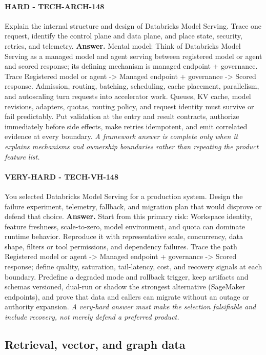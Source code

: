 \paragraph{HARD - TECH-ARCH-148} Explain the internal structure and design of Databricks Model Serving. Trace one request, identify the control plane and data plane, and place state, security, retries, and telemetry.
\textbf{Answer.} Mental model: Think of Databricks Model Serving as a managed model and agent serving between registered model or agent and scored response; its defining mechanism is managed endpoint + governance. Trace Registered model or agent -> Managed endpoint + governance -> Scored response. Admission, routing, batching, scheduling, cache placement, parallelism, and autoscaling turn requests into accelerator work. Queues, KV cache, model revisions, adapters, quotas, routing policy, and request identity must survive or fail predictably. Put validation at the entry and result contracts, authorize immediately before side effects, make retries idempotent, and emit correlated evidence at every boundary.
\textit{A framework answer is complete only when it explains mechanisms and ownership boundaries rather than repeating the product feature list.}
\paragraph{VERY-HARD - TECH-VH-148} You selected Databricks Model Serving for a production system. Design the failure experiment, telemetry, fallback, and migration plan that would disprove or defend that choice.
\textbf{Answer.} Start from this primary risk: Workspace identity, feature freshness, scale-to-zero, model environment, and quota can dominate runtime behavior. Reproduce it with representative scale, concurrency, data shape, filters or tool permissions, and dependency failures. Trace the path Registered model or agent -> Managed endpoint + governance -> Scored response; define quality, saturation, tail-latency, cost, and recovery signals at each boundary. Predefine a degraded mode and rollback trigger, keep artifacts and schemas versioned, dual-run or shadow the strongest alternative (SageMaker endpoints), and prove that data and callers can migrate without an outage or authority expansion.
\textit{A very-hard answer must make the selection falsifiable and include recovery, not merely defend a preferred product.}
\subsection{Retrieval, vector, and graph data}
